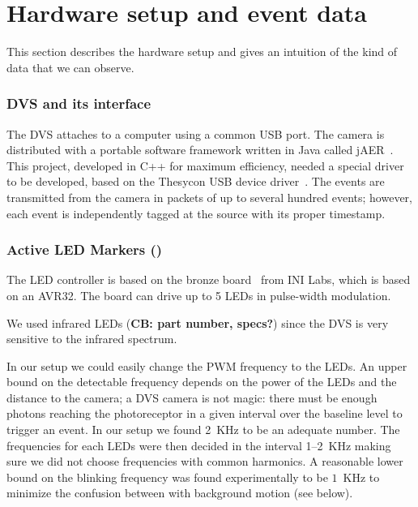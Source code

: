 
\section{Hardware setup and event data\label{sec:Hardware-setup-and}}

This section describes the hardware setup and gives an intuition of
the kind of data that we can observe.


\subsubsection{DVS and its interface \label{sec:interface}}

The DVS attaches to a computer using a common USB port. The camera
is distributed with a portable software framework written in Java
called jAER~\cite{jaer}. This project, developed in C++ for maximum
efficiency, needed a special driver to be developed, based on the
Thesycon USB device driver~\cite{thesycon}. The events are transmitted
from the camera in packets of up to several hundred events; however,
each event is independently tagged at the source with its proper timestamp. 




\subsubsection{Active LED Markers (\ALMs)\label{sec:leds}}

The LED controller is based on the bronze board~\cite{bronzeboard}
from INI Labs, which is based on an AVR32. The board can drive up
to 5 LEDs in pulse-width modulation.  

We used infrared LEDs (\textbf{CB: part number, specs?}) since the
DVS is very sensitive to the infrared spectrum. 



In our setup we could easily change the PWM frequency to the LEDs.
An upper bound on the detectable frequency depends on the power of
the LEDs and the distance to the camera; a DVS camera is not magic:
there must be enough photons reaching the photoreceptor in a given
interval over the baseline level to trigger an event. In our setup
we found 2~KHz to be an adequate number. The frequencies for each
LEDs were then decided in the interval 1--2~KHz making sure we did
not choose frequencies with common harmonics. A reasonable lower bound
on the blinking frequency was found experimentally to be $1$~KHz
to minimize the confusion between with background motion (see 
below).


